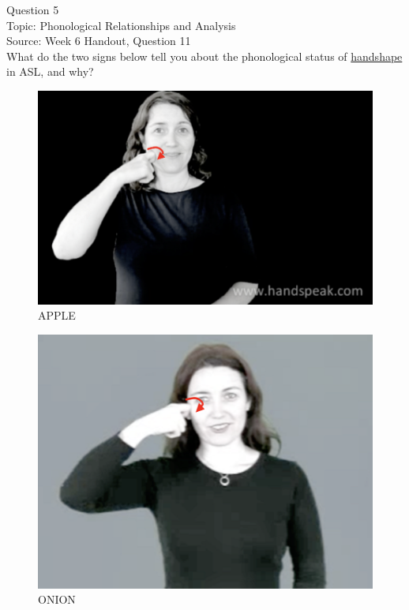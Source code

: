 \documentclass[12pt]{article}
\begin{document}
{\large Question 5}\\

Topic: Phonological Relationships and Analysis\\
Source: Week 6 Handout, Question 11\\

What do the two signs below tell you about the phonological status of \underline{handshape} in ASL, and why?\\

\begin{figure}[H]
\includegraphics{../images/asl_apple.png}
\caption{APPLE}
\end{figure}
\begin{figure}[H]
\includegraphics{../images/asl_onion.png}
\caption{ONION}
\end{figure}
\end{document}
